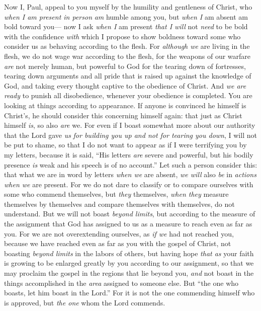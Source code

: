 \begin{biblechapter} %
 Now I, Paul, appeal to you myself by the humility and gentleness of Christ, who \textit{when I am present in person} \textit{am} humble among you, but \textit{when I} am absent am bold toward you—
\verse now I ask \textit{when I} am present \textit{that I will} not \textit{need} to be bold with the confidence \textit{with} which I propose to show boldness toward some who consider us as behaving according to the flesh.
\verse For \textit{although we} are living in the flesh, we do not wage war according to the flesh,
\verse for the weapons of our warfare \textit{are} not merely human, but powerful to God for the tearing down of fortresses, tearing down arguments
\verse and all pride that is raised up against the knowledge of God, and taking every thought captive to the obedience of Christ.
\verse And \textit{we are ready} to punish all disobedience, whenever your obedience is completed.
\verse You are looking at things according to appearance. If anyone is convinced he himself is Christ’s, he should consider this concerning himself again: that just as Christ himself \textit{is}, so also \textit{are} we.
\verse For even if I boast somewhat more about our authority that the Lord gave \textit{us} \textit{for building you up and not for tearing you down}, I will not be put to shame,
\verse so that I do not want to appear as if I were terrifying you by my letters,
\verse because it is said, “His letters \textit{are} severe and powerful, but his bodily presence \textit{is} weak and his speech is of no account.”
\verse Let such a person consider this: that what we are in word by letters \textit{when we} are absent, \textit{we will} also \textit{be} in \textit{actions} \textit{when we} are present.
\verse For we do not dare to classify or to compare ourselves with some who commend themselves, but \textit{they} themselves, \textit{when they} measure themselves by themselves and compare themselves with themselves, do not understand.
\verse But we will not boast \textit{beyond limits}, but according to the measure of the assignment that God has assigned to us as a measure to reach even as far as you.
\verse For we are not overextending ourselves, as \textit{if we} had not reached you, because we have reached even as far as you with the gospel of Christ,
\verse not boasting \textit{beyond limits} in the labors of others, but having hope \textit{that as} your faith is growing to be enlarged greatly by you according to our assignment,
\verse so that we may proclaim the gospel in the regions that lie beyond you, \textit{and} not boast in the things accomplished in the \textit{area} assigned to someone else.
\verse But “the one who boasts, let him boast in the Lord.”
\verse For it is not the one commending himself who is approved, but \textit{the one} whom the Lord commends.
\end{biblechapter}

